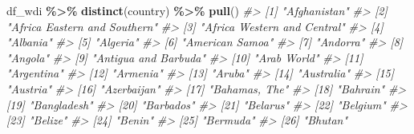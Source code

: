 \documentclass[
  xelatex, ja=standard]{bxjsbook}
\newenvironment{Shaded}{\begin{snugshade}}{\end{snugshade}}
\newcommand{\CommentTok}[1]{\textcolor[rgb]{0.56,0.35,0.01}{\textit{#1}}}
\newcommand{\FunctionTok}[1]{\textcolor[rgb]{0.13,0.29,0.53}{\textbf{#1}}}
\newcommand{\NormalTok}[1]{#1}
\newcommand{\SpecialCharTok}[1]{\textcolor[rgb]{0.81,0.36,0.00}{\textbf{#1}}}
\theoremstyle{definition}
\theoremstyle{definition}
\theoremstyle{definition}
\theoremstyle{definition}
\theoremstyle{remark}
\begin{document}
\begin{Shaded}
\begin{Highlighting}[]
\NormalTok{df\_wdi }\SpecialCharTok{\%\textgreater{}\%} \FunctionTok{distinct}\NormalTok{(country) }\SpecialCharTok{\%\textgreater{}\%} \FunctionTok{pull}\NormalTok{()}
\CommentTok{\#\textgreater{}   [1] "Afghanistan"                                         }
\CommentTok{\#\textgreater{}   [2] "Africa Eastern and Southern"                         }
\CommentTok{\#\textgreater{}   [3] "Africa Western and Central"                          }
\CommentTok{\#\textgreater{}   [4] "Albania"                                             }
\CommentTok{\#\textgreater{}   [5] "Algeria"                                             }
\CommentTok{\#\textgreater{}   [6] "American Samoa"                                      }
\CommentTok{\#\textgreater{}   [7] "Andorra"                                             }
\CommentTok{\#\textgreater{}   [8] "Angola"                                              }
\CommentTok{\#\textgreater{}   [9] "Antigua and Barbuda"                                 }
\CommentTok{\#\textgreater{}  [10] "Arab World"                                          }
\CommentTok{\#\textgreater{}  [11] "Argentina"                                           }
\CommentTok{\#\textgreater{}  [12] "Armenia"                                             }
\CommentTok{\#\textgreater{}  [13] "Aruba"                                               }
\CommentTok{\#\textgreater{}  [14] "Australia"                                           }
\CommentTok{\#\textgreater{}  [15] "Austria"                                             }
\CommentTok{\#\textgreater{}  [16] "Azerbaijan"                                          }
\CommentTok{\#\textgreater{}  [17] "Bahamas, The"                                        }
\CommentTok{\#\textgreater{}  [18] "Bahrain"                                             }
\CommentTok{\#\textgreater{}  [19] "Bangladesh"                                          }
\CommentTok{\#\textgreater{}  [20] "Barbados"                                            }
\CommentTok{\#\textgreater{}  [21] "Belarus"                                             }
\CommentTok{\#\textgreater{}  [22] "Belgium"                                             }
\CommentTok{\#\textgreater{}  [23] "Belize"                                              }
\CommentTok{\#\textgreater{}  [24] "Benin"                                               }
\CommentTok{\#\textgreater{}  [25] "Bermuda"                                             }
\CommentTok{\#\textgreater{}  [26] "Bhutan"                                              }

\end{Highlighting}
\end{Shaded}
\end{document}
